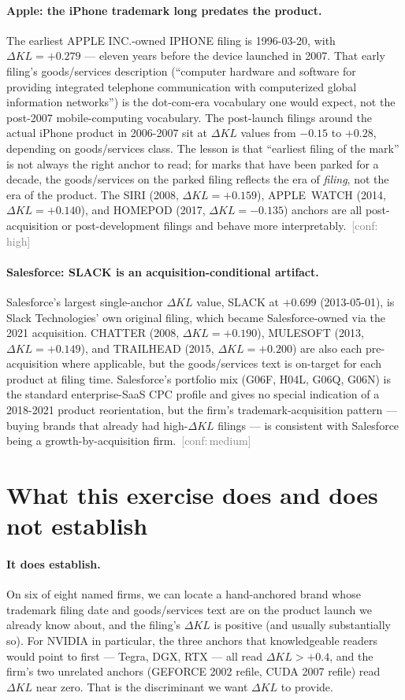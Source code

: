 \documentclass[11pt]{article}
\newcommand{\dKL}{\Delta KL}
\newcommand{\conf}[1]{\textcolor{gray}{\footnotesize\,[conf:\,#1]}}
\begin{document}
\paragraph{Apple: the iPhone trademark long predates the product.}
The earliest APPLE INC.-owned IPHONE filing is 1996-03-20, with
$\dKL = +0.279$ --- eleven years before the device launched in 2007.
That early filing's goods/services description (``computer hardware
and software for providing integrated telephone communication with
computerized global information networks'') is the dot-com-era
vocabulary one would expect, not the post-2007 mobile-computing
vocabulary. The post-launch filings around the actual iPhone product
in 2006-2007 sit at $\dKL$ values from $-0.15$ to $+0.28$, depending
on goods/services class. The lesson is that ``earliest filing of the
mark'' is not always the right anchor to read; for marks that have
been parked for a decade, the goods/services on the parked filing
reflects the era of \emph{filing}, not the era of the product. The
SIRI (2008, $\dKL = +0.159$), APPLE~WATCH (2014, $\dKL = +0.140$),
and HOMEPOD (2017, $\dKL = -0.135$) anchors are all post-acquisition
or post-development filings and behave more interpretably.
\conf{high}

\paragraph{Salesforce: SLACK is an acquisition-conditional artifact.}
Salesforce's largest single-anchor $\dKL$ value, SLACK at $+0.699$
(2013-05-01), is Slack Technologies' own original filing, which
became Salesforce-owned via the 2021 acquisition. CHATTER (2008,
$\dKL = +0.190$), MULESOFT (2013, $\dKL = +0.149$), and TRAILHEAD
(2015, $\dKL = +0.200$) are also each pre-acquisition where
applicable, but the goods/services text is on-target for each product
at filing time. Salesforce's portfolio mix (G06F, H04L, G06Q, G06N)
is the standard enterprise-SaaS CPC profile and gives no special
indication of a 2018-2021 product reorientation, but the firm's
trademark-acquisition pattern --- buying brands that already had
high-$\dKL$ filings --- is consistent with Salesforce being a
growth-by-acquisition firm. \conf{medium}

\section{What this exercise does and does not establish}

\paragraph{It does establish.} On six of eight named firms, we can
locate a hand-anchored brand whose trademark filing date and
goods/services text are on the product launch we already know about,
and the filing's $\dKL$ is positive (and usually substantially so).
For NVIDIA in particular, the three anchors that knowledgeable
readers would point to first --- Tegra, DGX, RTX --- all read
$\dKL > +0.4$, and the firm's two unrelated anchors (GEFORCE 2002
refile, CUDA 2007 refile) read $\dKL$ near zero. That is the
discriminant we want $\dKL$ to provide.
\end{document}
